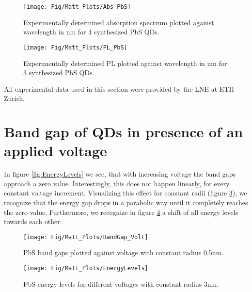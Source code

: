 	\begin{figure}[htpb]
		\texttt{[image: Fig/Matt\_Plots/Abs\_PbS]}
		\caption{Experimentally determined absorption spectrum plotted against wavelength in nm for 4 synthesized PbS \glspl{QD}.}
		\label{fig:Abs_PbS}
	\end{figure}
	
	\begin{figure}
		\texttt{[image: Fig/Matt\_Plots/PL\_PbS]}
		\caption{Experimentally determined \gls{PL} plotted against wavelength in nm for 3 synthesized PbS \glspl{QD}.}
		\label{fig:PL_PbS}
	\end{figure}
		
	\begin{REMARK}
		All experimental data used in this section were provided by the \gls{LNE} at ETH Zurich.
	\end{REMARK}





\section{Band gap of QDs in presence of an applied voltage}
	
	In figure \ref{fig:EnergyLevels} we see, that with increasing voltage the band gaps approach a zero value. Interestingly, this does not happen linearly, 
	for every constant voltage increment.	Visualizing this effect for constant radii (figure \ref{fig:BandGap_Volt}), we recognize that the energy gap drops in a	parabolic way until it completely reaches the zero value. Furthermore, we recognize in figure \ref{fig:EnergyLevels_Volt} a shift of all energy levels towards each other.
	\begin{figure}
		\texttt{[image: Fig/Matt\_Plots/BandGap\_Volt]}
		\caption{PbS band gaps plotted against voltage with constant radius 0.5nm.}
		\label{fig:BandGap_Volt}
	\end{figure}
	\begin{figure}
		\texttt{[image: Fig/Matt\_Plots/EnergyLevels]}
		\caption{PbS energy levels for different voltages with constant radius 3nm.}
		\label{fig:EnergyLevels_Volt}
	\end{figure}
	